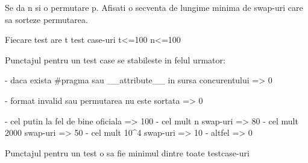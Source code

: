 
Se da n si o permutare p. Afisati o secventa de lungime minima de swap-uri care sa sorteze permutarea.

Fiecare test are t test case-uri
t<=100
n<=100

Punctajul pentru un test case se stabileste in felul urmator:

- daca exista #pragma sau __attribute__ in sursa concurentului => 0%

- format invalid sau permutarea nu este sortata => 0%

- cel putin la fel de bine oficiala => 100%
- cel mult n swap-uri => 80%
- cel mult 2000 swap-uri => 50%
- cel mult 10^4 swap-uri => 10%
- altfel => 0%

Punctajul pentru un test o sa fie minimul dintre toate testcase-uri

